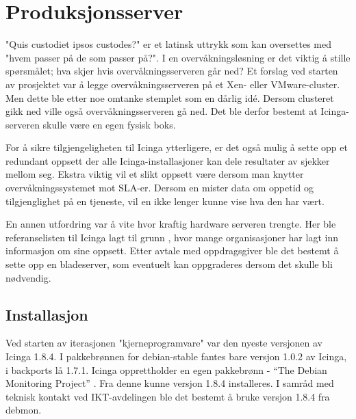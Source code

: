 \section{Produksjonsserver}
"Quis custodiet ipsos custodes?" er et latinsk uttrykk som kan oversettes med "hvem passer på de som passer på?". I en overvåkningsløsning er det viktig å stille spørsmålet; hva skjer hvis overvåkningsserveren går ned? Et forslag ved starten av prosjektet var å legge overvåkningsserveren på et Xen- eller VMware-cluster. Men dette ble etter noe omtanke stemplet som en dårlig idé. Dersom clusteret gikk ned ville også overvåkningsserveren gå ned. Det ble derfor bestemt at Icinga-serveren skulle være en egen fysisk boks. 

For å sikre tilgjengeligheten til Icinga ytterligere, er det også mulig å sette opp et redundant oppsett der alle Icinga-installasjoner kan dele resultater av sjekker mellom seg. Ekstra viktig vil et slikt oppsett være dersom man knytter overvåkningssystemet mot SLA-er. Dersom en mister data om oppetid og tilgjenglighet på en tjeneste, vil en ikke lenger kunne vise hva den har vært.

En annen utfordring var å vite hvor kraftig hardware serveren trengte. Her ble referanselisten til Icinga lagt til grunn \cite{icingainaction}, hvor mange organisasjoner har lagt inn informasjon om sine oppsett. Etter avtale med oppdragsgiver ble det bestemt å sette opp en bladeserver, som eventuelt kan oppgraderes dersom det skulle bli nødvendig. 

\subsection{Installasjon}
Ved starten av iterasjonen "kjerneprogramvare" var den nyeste versjonen av Icinga 1.8.4. I pakkebrønnen for debian-stable fantes bare versjon 1.0.2 av Icinga, i backports lå 1.7.1. Icinga opprettholder en egen pakkebrønn - ``The Debian Monitoring Project'' \cite{debmon}. Fra denne kunne versjon 1.8.4 installeres. I samråd med teknisk kontakt ved IKT-avdelingen ble det bestemt å bruke versjon 1.8.4 fra debmon.

